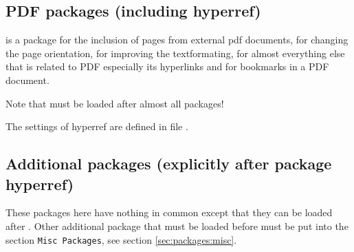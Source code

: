 
\subsection{PDF packages (including hyperref)}
\label{sec:packages:pdf}

 is a package for the inclusion of pages from external pdf documents,
 for changing the page orientation,
 for improving the textformating,
 for almost everything else that is related to PDF especially its hyperlinks and 
 for bookmarks in a PDF document.

Note that  must be loaded after almost all packages!

The settings of hyperref are defined in file 
.



\subsection{Additional packages  (explicitly after package hyperref)}
\label{sec:packages:additional}

These packages here have nothing in common except that they can be loaded after . Other additional package that must be loaded before must be put into the section \texttt{Misc Packages}, see section \cref{sec:packages:misc}.


